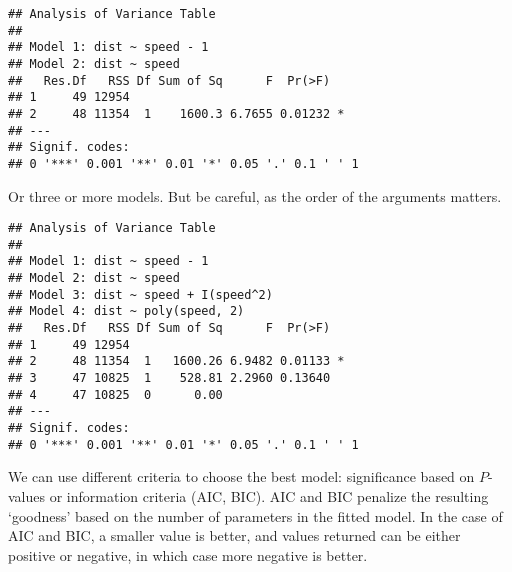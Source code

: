 \documentclass[paper=a4,headsepline,BCOR=12mm,twoside,open=right,%
titlepage,headings=small,fontsize=10pt,index=totoc,bibliography=totoc,%
captions=tableheading,captions=nooneline]{scrbook}\usepackage{knitr}
\begin{document}
\begin{knitrout}\footnotesize
{}\color{fgcolor}\begin{kframe}
\begin{alltt}
\end{alltt}
\begin{verbatim}
## Analysis of Variance Table
## 
## Model 1: dist ~ speed - 1
## Model 2: dist ~ speed
##   Res.Df   RSS Df Sum of Sq      F  Pr(>F)  
## 1     49 12954                              
## 2     48 11354  1    1600.3 6.7655 0.01232 *
## ---
## Signif. codes:  
## 0 '***' 0.001 '**' 0.01 '*' 0.05 '.' 0.1 ' ' 1
\end{verbatim}
\end{kframe}
\end{knitrout}

Or three or more models. But be careful, as the order of the arguments matters.

\begin{knitrout}\footnotesize
{}\color{fgcolor}\begin{kframe}
\begin{alltt}
\end{alltt}
\begin{verbatim}
## Analysis of Variance Table
## 
## Model 1: dist ~ speed - 1
## Model 2: dist ~ speed
## Model 3: dist ~ speed + I(speed^2)
## Model 4: dist ~ poly(speed, 2)
##   Res.Df   RSS Df Sum of Sq      F  Pr(>F)  
## 1     49 12954                              
## 2     48 11354  1   1600.26 6.9482 0.01133 *
## 3     47 10825  1    528.81 2.2960 0.13640  
## 4     47 10825  0      0.00                 
## ---
## Signif. codes:  
## 0 '***' 0.001 '**' 0.01 '*' 0.05 '.' 0.1 ' ' 1
\end{verbatim}
\end{kframe}
\end{knitrout}

We can use different criteria to choose the best model: significance based on $P$-values or information criteria (AIC, BIC). AIC and BIC penalize the resulting `goodness' based on the number of parameters in the fitted model. In the case of AIC and BIC, a smaller value is better, and values returned can be either positive or negative, in which case more negative is better.
\end{document}
